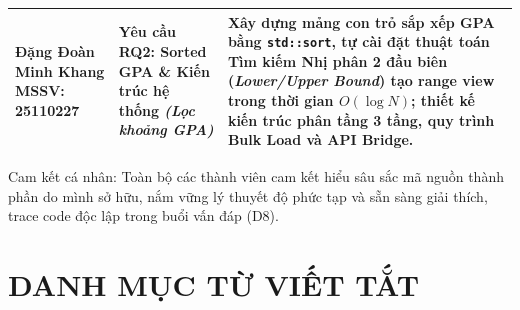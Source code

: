 \documentclass[14pt,a4paper]{extarticle}
\begin{document}
\begin{table}[H]
\begin{tabularx}{\textwidth}{|>{\raggedright\arraybackslash}m{3.2cm}|>{\raggedright\arraybackslash}m{3.8cm}|>{\raggedright\arraybackslash}X|}
Đặng Đoàn Minh Khang \newline MSSV: 25110227 & Yêu cầu RQ2: Sorted GPA \& Kiến trúc hệ thống \newline \textit{(Lọc khoảng GPA)} & Xây dựng mảng con trỏ sắp xếp GPA bằng \texttt{std::sort}, tự cài đặt thuật toán Tìm kiếm Nhị phân 2 đầu biên (\textit{Lower/Upper Bound}) tạo range view trong thời gian $O(\log N)$; thiết kế kiến trúc phân tầng 3 tầng, quy trình Bulk Load và API Bridge. \\ \hline
\end{tabularx}
\endgroup
\end{table}

\noindent
Cam kết cá nhân: Toàn bộ các thành viên cam kết hiểu sâu sắc mã nguồn thành phần do mình sở hữu, nắm vững lý thuyết độ phức tạp và sẵn sàng giải thích, trace code độc lập trong buổi vấn đáp (D8).

\newpage
\thispagestyle{empty}

\tableofcontents

\newpage
\thispagestyle{empty}
\listoffigures

\newpage
\thispagestyle{empty}
\section*{DANH MỤC TỪ VIẾT TẮT}
\end{document}
